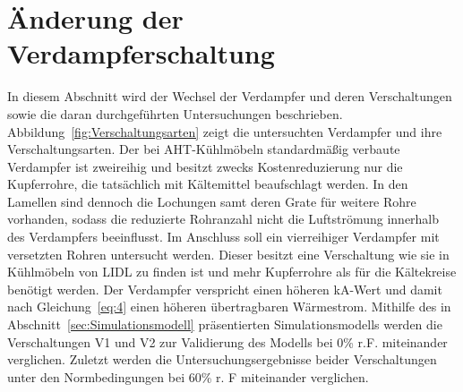 \section{Änderung der Verdampferschaltung}
\label{sec:Änderung der Verdampferschaltung}

In diesem Abschnitt wird der Wechsel der Verdampfer und deren Verschaltungen sowie die daran durchgeführten Untersuchungen beschrieben. Abbildung~\ref{fig:Verschaltungsarten} zeigt die untersuchten Verdampfer und ihre Verschaltungsarten. Der bei AHT-Kühlmöbeln standardmäßig verbaute Verdampfer ist zweireihig und besitzt zwecks Kostenreduzierung nur die Kupferrohre, die tatsächlich mit Kältemittel beaufschlagt werden. In den Lamellen sind dennoch die Lochungen samt deren Grate für weitere Rohre vorhanden, sodass die reduzierte Rohranzahl nicht die Luftströmung innerhalb des Verdampfers beeinflusst. Im Anschluss soll ein vierreihiger Verdampfer mit versetzten Rohren untersucht werden. Dieser besitzt eine Verschaltung wie sie in Kühlmöbeln von LIDL zu finden ist und mehr Kupferrohre als für die Kältekreise benötigt werden. Der Verdampfer verspricht einen höheren kA-Wert und damit nach Gleichung~\ref{eq:4} einen höheren übertragbaren Wärmestrom. Mithilfe des in Abschnitt~\ref{sec:Simulationsmodell} präsentierten Simulationsmodells werden die Verschaltungen V1 und V2 zur Validierung des Modells bei \unit{0}{\%} r.F.  miteinander verglichen. Zuletzt werden die Untersuchungsergebnisse beider Verschaltungen unter den Normbedingungen bei \unit{60}{\%} r. F miteinander verglichen.

